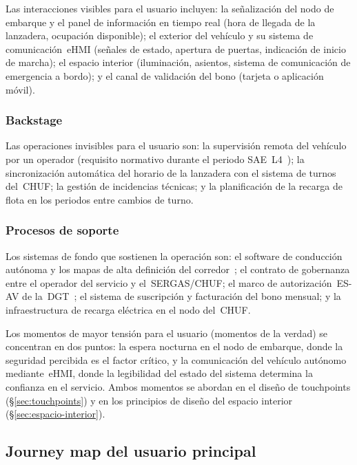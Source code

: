 Las interacciones visibles para el usuario incluyen: la señalización
del nodo de embarque y el panel de información en tiempo real
(hora de llegada de la lanzadera, ocupación disponible); el exterior
del vehículo y su sistema de comunicación~eHMI (señales de estado,
apertura de puertas, indicación de inicio de marcha); el espacio
interior (iluminación, asientos, sistema de comunicación de
emergencia a bordo); y el canal de validación del bono (tarjeta o
aplicación móvil).

\subsubsection{Backstage}

Las operaciones invisibles para el usuario son: la supervisión
remota del vehículo por un operador (requisito normativo durante
el periodo SAE~L4~\parencite{AVENUE2023}); la sincronización
automática del horario de la lanzadera con el sistema de turnos
del~\acs{CHUF}; la gestión de incidencias técnicas; y la
planificación de la recarga de flota en los periodos entre
cambios de turno.

\subsubsection{Procesos de soporte}

Los sistemas de fondo que sostienen la operación son: el software
de conducción autónoma y los mapas de alta definición del
corredor~\parencite{SHOWd812020}; el contrato de gobernanza entre
el operador del servicio y el~\acs{SERGAS}/\acs{CHUF}; el marco
de autorización~ES-AV de la~\acs{DGT}~\parencite{DGTESAV2026};
el sistema de suscripción y facturación del bono mensual; y la
infraestructura de recarga eléctrica en el nodo del~\acs{CHUF}.

Los momentos de mayor tensión para el usuario (momentos de la
verdad) se concentran en dos puntos: la espera nocturna en el
nodo de embarque, donde la seguridad percibida es el factor
crítico, y la comunicación del vehículo autónomo mediante~eHMI,
donde la legibilidad del estado del sistema determina la
confianza en el servicio. Ambos momentos se abordan en el
diseño de touchpoints (§\ref{sec:touchpoints}) y en los
principios de diseño del espacio interior
(§\ref{sec:espacio-interior}).

\subsection{Journey map del usuario principal}
\label{sec:journey-map}

